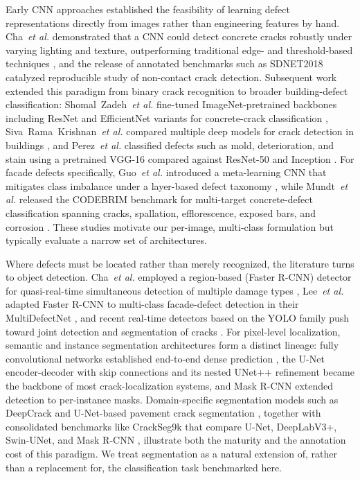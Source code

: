 \documentclass[conference]{IEEEtran}
\begin{document}
Early CNN approaches established the feasibility of learning defect representations directly from images rather than engineering features by hand. Cha~\textit{et al.} demonstrated that a CNN could detect concrete cracks robustly under varying lighting and texture, outperforming traditional edge- and threshold-based techniques \cite{ref5}, and the release of annotated benchmarks such as SDNET2018 \cite{ref6} catalyzed reproducible study of non-contact crack detection. Subsequent work extended this paradigm from binary crack recognition to broader building-defect classification: Shomal~Zadeh~\textit{et al.} fine-tuned ImageNet-pretrained backbones including ResNet and EfficientNet variants for concrete-crack classification \cite{ref7}, Siva~Rama~Krishnan~\textit{et al.} compared multiple deep models for crack detection in buildings \cite{ref8}, and Perez~\textit{et al.} classified defects such as mold, deterioration, and stain using a pretrained VGG-16 compared against ResNet-50 and Inception \cite{ref9}. For facade defects specifically, Guo~\textit{et al.} introduced a meta-learning CNN that mitigates class imbalance under a layer-based defect taxonomy \cite{ref10}, while Mundt~\textit{et al.} released the CODEBRIM benchmark for multi-target concrete-defect classification spanning cracks, spallation, efflorescence, exposed bars, and corrosion \cite{ref11}. These studies motivate our per-image, multi-class formulation but typically evaluate a narrow set of architectures.

Where defects must be located rather than merely recognized, the literature turns to object detection. Cha~\textit{et al.} employed a region-based (Faster R-CNN) detector for quasi-real-time simultaneous detection of multiple damage types \cite{ref12}, Lee~\textit{et al.} adapted Faster R-CNN to multi-class facade-defect detection in their MultiDefectNet \cite{ref13}, and recent real-time detectors based on the YOLO family push toward joint detection and segmentation of cracks \cite{ref14}. For pixel-level localization, semantic and instance segmentation architectures form a distinct lineage: fully convolutional networks established end-to-end dense prediction \cite{ref15}, the U-Net encoder-decoder with skip connections \cite{ref16} and its nested UNet++ refinement \cite{ref17} became the backbone of most crack-localization systems, and Mask R-CNN \cite{ref18} extended detection to per-instance masks. Domain-specific segmentation models such as DeepCrack \cite{ref19} and U-Net-based pavement crack segmentation \cite{ref20}, together with consolidated benchmarks like CrackSeg9k that compare U-Net, DeepLabV3+, Swin-UNet, and Mask R-CNN \cite{ref21}, illustrate both the maturity and the annotation cost of this paradigm. We treat segmentation as a natural extension of, rather than a replacement for, the classification task benchmarked here.
\end{document}

